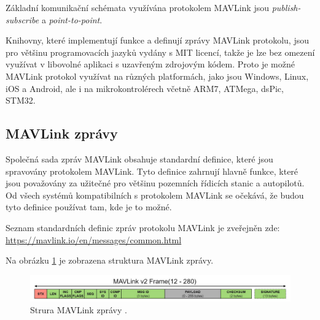 Základní komunikační schémata využívána protokolem MAVLink jsou \textit{publish-subscribe} a \textit{point-to-point}.

Knihovny, které implementují funkce a definují zprávy MAVLink protokolu, jsou pro většinu programovacích jazyků vydány s MIT licencí, takže je lze bez omezení využívat v libovolné aplikaci s uzavřeným zdrojovým kódem. Proto je možné MAVLink protokol využívat na různých platformách, jako jsou Windows, Linux, iOS a Android, ale i na mikrokontrolérech včetně ARM7, ATMega, dsPic, STM32. \cite{MAVLINK}

\subsection{MAVLink zprávy}

Společná sada zpráv MAVLink obsahuje standardní definice, které jsou spravovány protokolem MAVLink. Tyto definice zahrnují hlavně funkce, které jsou považovány za užitečné pro většinu pozemních řídicích stanic a autopilotů. Od všech systémů kompatibilních s protokolem MAVLink se očekává, že budou tyto definice používat tam, kde je to možné.

Seznam standardních definic zpráv protokolu MAVLink je zveřejněn zde: \url{https://mavlink.io/en/messages/common.html}

Na obrázku \ref{fig:MAV1} je zobrazena struktura MAVLink zprávy.

\begin{figure}[!ht]
  \begin{center}
    \hspace*{-1cm}
    \includegraphics[scale=0.31]{obrazky/MAV1}
  \end{center}
  \caption[Strura MAVLink zprávy]{Strura MAVLink zprávy \cite{MAVLINK}.}
  \label{fig:MAV1}
\end{figure}


